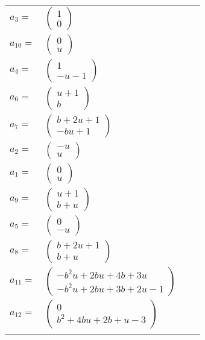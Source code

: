 \documentclass[1p]{elsarticle_modified}
\theoremstyle{definition}
\begin{document}
\begin{tabular}{m{7pt} m{180pt} m{7pt} m{180pt} }
\flushright $a_{3}=$&$\begin{pmatrix}1\\0\end{pmatrix}$ \\
\flushright $a_{10}=$&$\begin{pmatrix}0\\u\end{pmatrix}$ \\
\flushright $a_{4}=$&$\begin{pmatrix}1\\- u-1\end{pmatrix}$ \\
\flushright $a_{6}=$&$\begin{pmatrix}u+1\\b\end{pmatrix}$ \\
\flushright $a_{7}=$&$\begin{pmatrix}b+2 u+1\\- b u+1\end{pmatrix}$ \\
\flushright $a_{2}=$&$\begin{pmatrix}- u\\u\end{pmatrix}$ \\
\flushright $a_{1}=$&$\begin{pmatrix}0\\u\end{pmatrix}$ \\
\flushright $a_{9}=$&$\begin{pmatrix}u+1\\b+u\end{pmatrix}$ \\
\flushright $a_{5}=$&$\begin{pmatrix}0\\- u\end{pmatrix}$ \\
\flushright $a_{8}=$&$\begin{pmatrix}b+2 u+1\\b+u\end{pmatrix}$ \\
\flushright $a_{11}=$&$\begin{pmatrix}- b^2 u+2 b u+4 b+3 u\\- b^2 u+2 b u+3 b+2 u-1\end{pmatrix}$ \\
\flushright $a_{12}=$&$\begin{pmatrix}0\\b^2+4 b u+2 b+u-3\end{pmatrix}$\\&\end{tabular}
\end{document}
